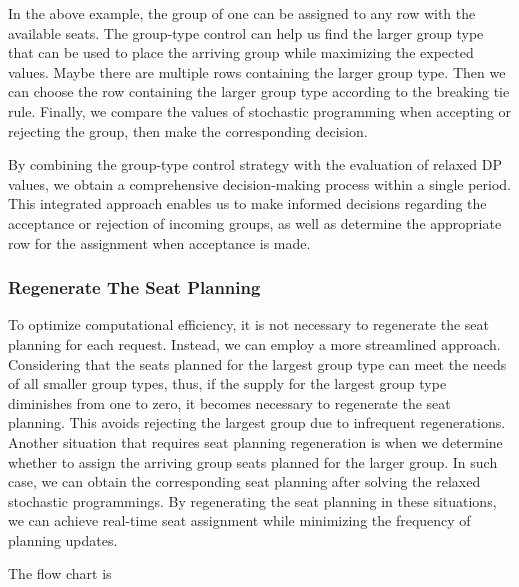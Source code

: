 In the above example, the group of one can be assigned to any row with the available seats. The group-type control can help us find the larger group type that can be used to place the arriving group while maximizing the expected values. Maybe there are multiple rows containing the larger group type. Then we can choose the row containing the larger group type according to the breaking tie rule. 
Finally, we compare the values of stochastic programming when accepting or rejecting the group, then make the corresponding decision.

By combining the group-type control strategy with the evaluation of relaxed DP values, we obtain a comprehensive decision-making process within a single period. This integrated approach enables us to make informed decisions regarding the acceptance or rejection of incoming groups, as well as determine the appropriate row for the assignment when acceptance is made.

\subsubsection{Regenerate The Seat Planning}
To optimize computational efficiency, it is not necessary to regenerate the seat planning for each request. Instead, we can employ a more streamlined approach. Considering that the seats planned for the largest group type can meet the needs of all smaller group types, thus, if the supply for the largest group type diminishes from one to zero, it becomes necessary to regenerate the seat planning. This avoids rejecting the largest group due to infrequent regenerations. Another situation that requires seat planning regeneration is when we determine whether to assign the arriving group seats planned for the larger group. In such case, we can obtain the corresponding seat planning after solving the relaxed stochastic programmings. By regenerating the seat planning in these situations, we can achieve real-time seat assignment while minimizing the frequency of planning updates.



The flow chart is 

